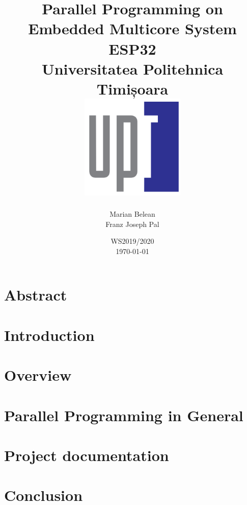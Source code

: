 \documentclass[12pt, twoside]{report}
\title{
	{Parallel Programming on Embedded Multicore System ESP32\bigskip}\\
	{\large Universitatea Politehnica Timișoara\bigskip\bigskip}\\
	{\includegraphics[width=50mm,scale=0.5]{upt_logo.png}}
}
\author{ Marian Belean\\ Franz Joseph Pal }
\date{ WS2019/2020 \\ \today}
\begin{document}
\maketitle


\chapter*{Abstract}




\tableofcontents

\chapter{Introduction}\label{chap:introduction}



\chapter{Overview}\label{chap:overview}


\chapter{Parallel Programming in General}\label{chap:parallelprg}


\chapter{Project documentation}\label{chap:documentation}


\chapter{Conclusion}\label{chap:conclusion}


\printbibliography
\end{document}
